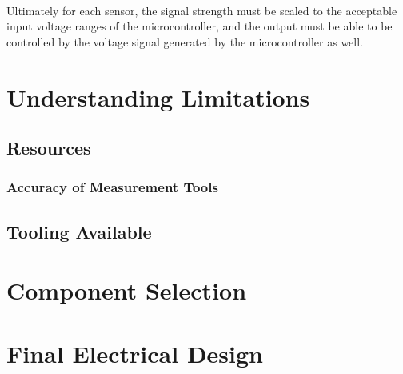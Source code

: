 \documentclass[12pt]{article}
\begin{document}
  \paragraph{}
  Ultimately for each sensor, the signal strength must be scaled to the acceptable input voltage ranges of the microcontroller, and the output must be able to be controlled by the voltage signal generated by the microcontroller as well.
	\section{Understanding Limitations}
	\subsection{Resources}
  \subsubsection{Accuracy of Measurement Tools}
	\subsection{Tooling Available}
	
	\section{Component Selection}
	
	\section{Final Electrical Design}
	
	
    \printglossaries
    
    \printbibliography[heading=bibintoc]
	
\end{document}
